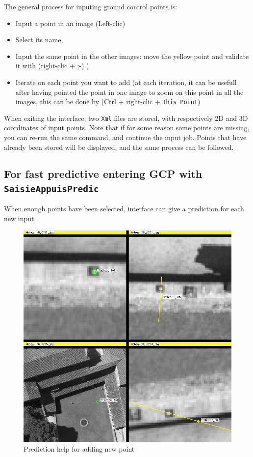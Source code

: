 The general process for inputing ground control points is:
\begin{itemize}
\item Input a point in an image (Left-clic)
\item Select its name, 
\item Input the same point in the other images: move the yellow point and validate it with (right-clic + ;-) )
\item Iterate on each point you want to add (at each iteration, it can be usefull after having pointed the point in one image to zoom on this point in all the images,
this can be done by (Ctrl + right-clic + {\tt This Point})
\end{itemize}

When exiting the interface, two {\tt Xml} files are stored, with respectively 2D and 3D coordinates of input points.
Note that if for some reason some points are missing, you can re-run the same command, and continue the input job.
Points that have already been stored will be displayed, and the same process can be followed.

\subsection{For fast predictive entering GCP with {\tt SaisieAppuisPredic}}

When enough points have been selected, interface can give a prediction for each new input:

\begin{figure}[H]
\begin{center}
\includegraphics[width=120mm]{FIGS/Saisie/prediction.jpg}
\end{center}
\caption{Prediction help for adding new point}
\label{FIG:SaisieAppuis:prediction}
\end{figure}

